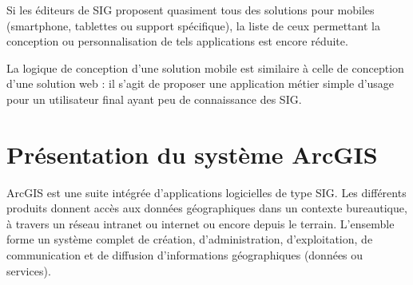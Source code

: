 \documentclass[11pt]{article}
\begin{document}
Si les éditeurs de SIG proposent quasiment tous des solutions pour mobiles (smartphone, tablettes ou support spécifique), la liste de ceux permettant la conception ou personnalisation de tels applications est encore réduite.

La logique de conception d'une solution mobile est similaire à celle de conception d'une solution web : il s'agit de proposer une application métier simple d'usage pour un utilisateur final ayant peu de connaissance des SIG. 

%

\newpage



\section{Présentation du système ArcGIS}
ArcGIS est une suite intégrée d'applications logicielles de type SIG. Les différents produits donnent accès aux données géographiques dans un contexte  bureautique, à travers un réseau intranet ou internet ou encore depuis le terrain. L'ensemble forme un système complet de création, d'administration, d'exploitation, de communication et de diffusion d'informations géographiques (données ou services).
\end{document}
